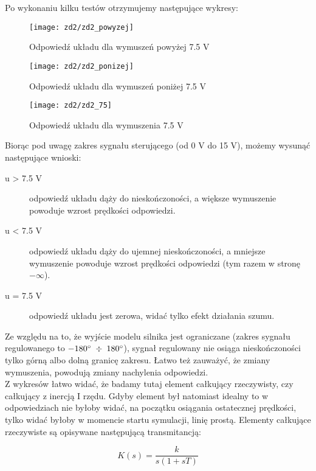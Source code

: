 \documentclass[11 pt]{article}
\begin{document}
Po wykonaniu kilku testów otrzymujemy następujące wykresy:

\newcommand{\w}{0.9}

\begin{figure}[h!]
	\centerline{
	\texttt{[image: zd2/zd2\_powyzej]}
	}
	\caption{Odpowiedź układu dla wymuszeń powyżej 7.5 V}
\end{figure}

\begin{figure}[h!]
	\centerline{
	\texttt{[image: zd2/zd2\_ponizej]}
	}
	\caption{Odpowiedź układu dla wymuszeń poniżej 7.5 V}
\end{figure}

\newpage

\begin{figure}[h!]
	\center
	\texttt{[image: zd2/zd2\_75]}
	\caption{Odpowiedź układu dla wymuszenia 7.5 V}
\end{figure}

Biorąc pod uwagę zakres sygnału sterującego (od 0 V do 15 V), możemy wysunąć następujące wnioski:

\begin{description}
\item[u > 7.5 V] odpowiedź układu dąży do nieskończoności, a większe wymuszenie powoduje wzrost prędkości odpowiedzi.
\item[u < 7.5 V] odpowiedź układu dąży do ujemnej nieskończoności, a mniejsze wymuszenie powoduje wzrost prędkości odpowiedzi (tym razem w stronę $- \infty$).
\item[u = 7.5 V] odpowiedź układu jest zerowa, widać tylko efekt działania szumu.
\end{description}

Ze względu na to, że wyjście modelu silnika jest ograniczane (zakres sygnału regulowanego to $-180 \degree \; \div \; 180 \degree$), sygnał regulowany nie osiąga nieskończoności tylko górną albo dolną granicę zakresu. Łatwo też zauważyć, że zmiany wymuszenia, powodują zmiany nachylenia odpowiedzi.\\

Z wykresów łatwo widać, że badamy tutaj element całkujący rzeczywisty, czy całkujący z inercją I rzędu. Gdyby element był natomiast idealny to w odpowiedziach nie byłoby widać, na początku osiągania ostatecznej prędkości, tylko widać byłoby w momencie startu symulacji, linię prostą. Elementy całkujące rzeczywiste są opisywane następującą transmitancją:

\begin{equation*}
K(s) = \frac{k}{s(1 + sT)}
\end{equation*}
\end{document}
